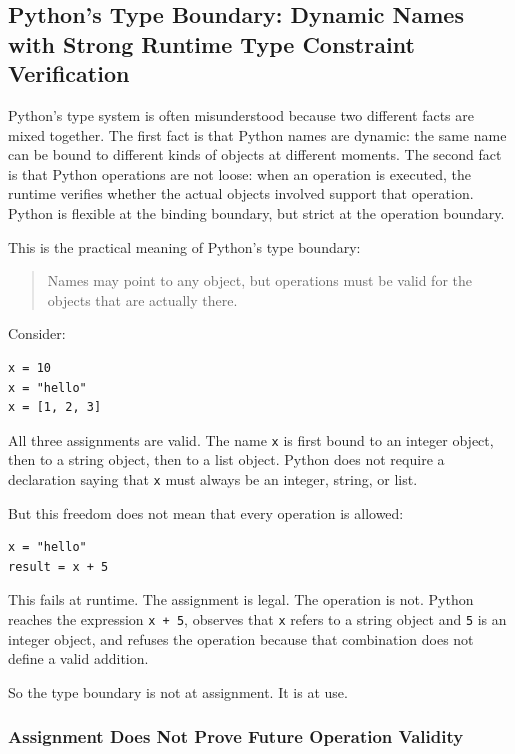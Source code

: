 \subsection{Python's Type Boundary: Dynamic Names with Strong Runtime Type Constraint Verification}

Python's type system is often misunderstood because two different facts are mixed together. The first fact is that Python names are dynamic: the same name can be bound to different kinds of objects at different moments. The second fact is that Python operations are not loose: when an operation is executed, the runtime verifies whether the actual objects involved support that operation. Python is flexible at the binding boundary, but strict at the operation boundary.

This is the practical meaning of Python's type boundary:

\begin{quote}
Names may point to any object, but operations must be valid for the objects that are actually there.
\end{quote}

Consider:

\begin{verbatim}
x = 10
x = "hello"
x = [1, 2, 3]
\end{verbatim}

All three assignments are valid. The name \texttt{x} is first bound to an integer object, then to a string object, then to a list object. Python does not require a declaration saying that \texttt{x} must always be an integer, string, or list.

But this freedom does not mean that every operation is allowed:

\begin{verbatim}
x = "hello"
result = x + 5
\end{verbatim}

This fails at runtime. The assignment is legal. The operation is not. Python reaches the expression \texttt{x + 5}, observes that \texttt{x} refers to a string object and \texttt{5} is an integer object, and refuses the operation because that combination does not define a valid addition.

So the type boundary is not at assignment. It is at use.

\subsubsection*{Assignment Does Not Prove Future Operation Validity}

